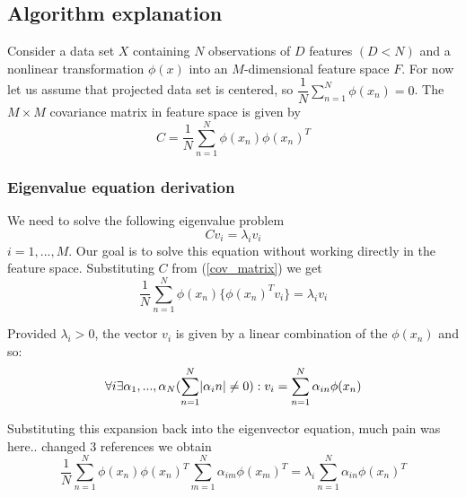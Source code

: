 \subsection{Algorithm explanation}
Consider a data set $X$ containing $N$ observations of $D$ features $(D < N)$ and a nonlinear transformation $\phi(x)$ into an $M$-dimensional feature space $F$. For now let us assume that projected data set is centered, so $\dfrac{1}{N}\sum_{n=1}^{N}{\phi(x_n)}=0$.
The $M \times M$ covariance matrix in feature space is given by
\begin{equation}\label{cov_matrix}
C =  \dfrac{1}{N}\sum_{n=1}^{N}{\phi(x_n)\phi(x_n)^T}
\end{equation}

\subsubsection{Eigenvalue equation derivation}
We need to solve the following eigenvalue problem
\begin{equation}\label{eigenvector_eq}
Cv_i = \lambda_i v_i
\end{equation}
$i=1,...,M$. Our goal is to solve this equation without working directly in the feature space. Substituting $C$ from (\ref{cov_matrix}) we get
\begin{equation}
\dfrac{1}{N}\sum_{n=1}^{N}{\phi(x_n)\{\phi(x_n)^Tv_i\}} = \lambda_i v_i
\end{equation}

Provided $\lambda_i > 0$, the vector $v_i$ is given by a linear combination of the $\phi(x_n)$ and so:
\begin{equation}\label{eigenvector_by_alphas}
\forall i \exists \\  \alpha_1,...,\alpha_N  \\ (\sum_{n=1}^{N}\lvert\alpha_in\rvert\neq 0): \\
v_i = \sum_{n=1}^{N}{\alpha_{in}\phi(x_n)}
\end{equation}

Substituting this expansion back into the eigenvector equation, {much pain was here.. changed 3 references} we obtain
\begin{equation}\label{big_equation}
\dfrac{1}{N}\sum_{n=1}^{N}{\phi(x_n)\phi(x_n)^T} \sum_{m=1}^{N}{\alpha_{im}\phi(x_m)^T} = \lambda_i \sum_{n=1}^{N}{\alpha_{in}\phi(x_n)^T}
\end{equation}

